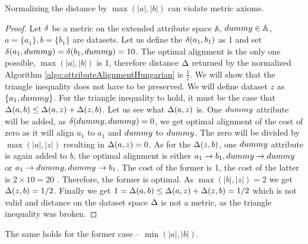 \begin{observation}
	Normalizing the distance by $\max(|a|,|b|)$ can violate metric axioms.
	\begin{proof}
		Let $\delta$ be a metric on the extended attribute space $\mathbb{A}$, $dummy \in \mathbb{A}$, $a=\lbrace a_1 \rbrace,b= \lbrace b_1 \rbrace$ are datasets. Let us define the $\delta(a_1,b_1)$ as 1 and set $\delta(a_1,dummy)=\delta(b_1,dummy)=10$. The optimal alignment is the only one possible, $\max(|a|,|b|)$ is 1, therefore distance $\Delta$ returned by the normalized Algorithm \ref{algo:attributeAlignmentHungarian} is $\frac{1}{1}$. We will show that the triangle inequality does not have to be preserved. We will define dataset $z$ as $\lbrace a_1,dummy \rbrace$. For the triangle inequality to hold, it must be the case that $\Delta(a,b) \le \Delta(a,z)+\Delta(z,b)$. Let us see what $\Delta(a,z)$ is. One $dummy$ attribute will be added, as $\delta(dummy,dummy)=0$, we get optimal alignment of the cost of zero as it will align $a_1$ to $a_1$ and $dummy$ to $dummy$. The zero will be divided by  $\max(|a|,|z|)$ resulting in $\Delta(a,z)=0$. As for the $\Delta(z,b)$, one $dummy$ attribute is again added to $b$,  the optimal alignment is either $a_1 \rightarrow b_1, dummy \rightarrow dummy$ or $a_1 \rightarrow dummy, dummy \rightarrow b_1$. The cost of the former is 1, the cost of the latter is $2 \times 10=20$ . Therefore, the former is optimal. As $\max(|b|,|z|)=2$ we get $\Delta(z,b)=1/2$.
		Finally we get $1=\Delta(a,b) \le \Delta(a,z)+\Delta(z,b)=1/2$ which is not valid and distance on the dataset space $\Delta$ is not a metric, as the triangle inequality was broken.
	\end{proof}
\end{observation}

The same holds for the former case -- $\min(|a|,|b|)$.

